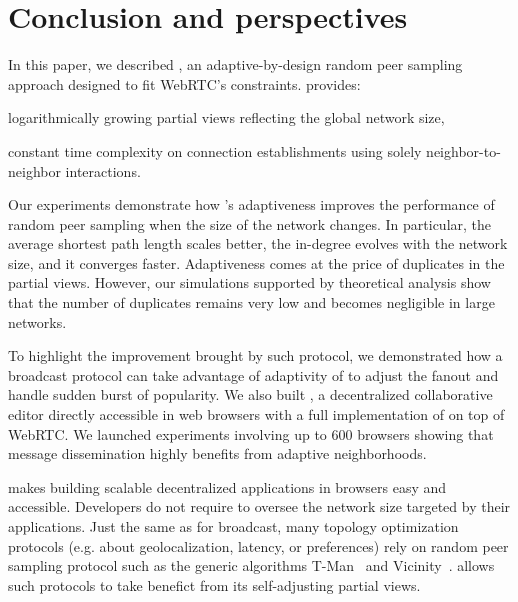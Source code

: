 
\section{Conclusion and perspectives}
\label{sec:conclusion}



In this paper, we described \SPRAY, an adaptive-by-design random peer sampling
approach designed to fit WebRTC's constraints.  \SPRAY provides:
\begin{inparaenum}[(i)]
\item logarithmically growing partial views reflecting the global network size,
\item constant time complexity on connection establishments using solely
  neighbor-to-neighbor interactions.
\end{inparaenum}
Our experiments demonstrate how \SPRAY's adaptiveness improves the performance
of random peer sampling when the size of the network changes. In particular, the
average shortest path length scales better, the in-degree evolves with the
network size, and it converges faster.  Adaptiveness comes at the price of
duplicates in the partial views. However, our simulations supported by
theoretical analysis show that the number of duplicates remains very low and
becomes negligible in large networks.

To highlight the improvement brought by such protocol, we demonstrated
how a broadcast protocol can take advantage of adaptivity of \SPRAY to
adjust the fanout and handle sudden burst of popularity. We also built
\CRATE, a decentralized collaborative editor directly accessible in
web browsers with a full implementation of \SPRAY on top of WebRTC. We
launched experiments involving up to 600 browsers showing that message
dissemination highly benefits from adaptive neighborhoods.

\SPRAY makes building scalable decentralized applications in browsers
easy and accessible.  Developers do not require to oversee the network
size targeted by their applications. Just the same as for broadcast,
many topology optimization protocols (e.g. about geolocalization,
latency, or preferences) rely on random peer sampling protocol such as
the generic algorithms T-Man~\cite{jelasity2009tman} and
Vicinity~\cite{voulgaris2005epidemic}. \SPRAY allows such protocols to
take benefict from its self-adjusting partial views.

